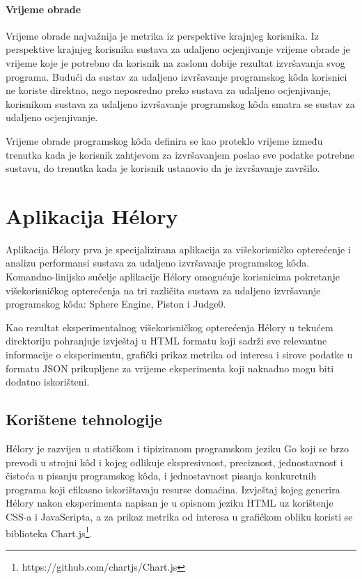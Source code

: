 \documentclass[times, utf8, diplomski]{fer}
\begin{document}
\subsubsection{Vrijeme obrade}
Vrijeme obrade  najvažnija je metrika iz perspektive krajnjeg korisnika. Iz perspektive krajnjeg korisnika sustava za udaljeno ocjenjivanje vrijeme obrade je vrijeme koje je potrebno da korisnik na zaslonu dobije rezultat izvršavanja svog programa. Budući da sustav za udaljeno izvršavanje programskog kôda korisnici ne koriste direktno, nego neposredno preko sustava za udaljeno ocjenjivanje, korisnikom sustava za udaljeno izvršavanje programskog kôda smatra se sustav za udaljeno ocjenjivanje.

Vrijeme obrade programskog kôda definira se kao proteklo vrijeme između trenutka kada je korisnik zahtjevom za izvršavanjem poslao sve podatke potrebne sustavu, do trenutka kada je korisnik ustanovio da je izvršavanje završilo.

\chapter{Aplikacija Hélory}
\label{chap:helory}
Aplikacija Hélory prva je specijalizirana aplikacija za višekorisničko opterećenje i analizu performansi sustava za udaljeno izvršavanje programskog kôda. Komandno-linijsko sučelje aplikacije Hélory omogućuje korisnicima pokretanje višekorisničkog opterećenja na tri različita sustava za udaljeno izvršavanje programskog kôda: Sphere Engine, Piston i Judge0.

Kao rezultat eksperimentalnog višekorisničkog opterećenja Hélory u tekućem direktoriju pohranjuje izvještaj u HTML formatu koji sadrži sve relevantne informacije o eksperimentu, grafički prikaz metrika od interesa i sirove podatke u formatu JSON prikupljene za vrijeme eksperimenta koji naknadno mogu biti dodatno iskorišteni.

\section{Korištene tehnologije}
Hélory je razvijen u statičkom i tipiziranom programskom jeziku Go \citep{donovan2015go} koji se brzo prevodi u strojni kôd i kojeg odlikuje ekspresivnost, preciznost, jednostavnost i čistoća u pisanju programskog kôda, i jednostavnost pisanja konkuretnih programa koji efikasno iskorištavaju resurse domaćina. Izvještaj kojeg generira Hélory nakon eksperimenta napisan je u opisnom jeziku HTML uz korištenje CSS-a i JavaScripta, a za prikaz metrika od interesa u grafičkom obliku koristi se biblioteka Chart.js\footnote{https://github.com/chartjs/Chart.js}.
\end{document}
